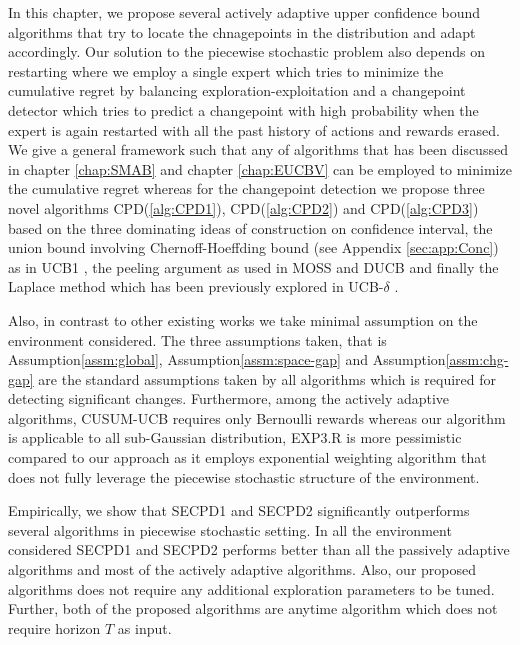 In this chapter, we propose several actively adaptive upper confidence bound algorithms that try to locate the chnagepoints in the distribution and adapt accordingly. Our solution to the piecewise stochastic problem also depends on restarting where we employ a single expert which tries to minimize the cumulative regret by balancing exploration-exploitation and a changepoint detector which tries to predict a changepoint with high probability when the expert is again restarted with all the past history of actions and rewards erased. We give a general framework such that any of algorithms that has been discussed in chapter \ref{chap:SMAB} and chapter \ref{chap:EUCBV} can be employed to minimize the cumulative regret whereas for the changepoint detection we propose three novel algorithms CPD(\ref{alg:CPD1}), CPD(\ref{alg:CPD2}) and CPD(\ref{alg:CPD3}) based on the three dominating ideas of construction on confidence interval, the union bound involving Chernoff-Hoeffding bound (see Appendix \ref{sec:app:Conc}) as in UCB1 \citep{auer2002finite}, the peeling argument as used in MOSS\citep{audibert2009minimax} and DUCB \citep{garivier2011upper} and finally the Laplace method which has been previously explored in UCB-$\delta$ \citep{abbasi2011improved}.

	Also, in contrast to other existing works we take minimal assumption on the environment considered. The three assumptions taken, that is Assumption\ref{assm:global}, Assumption\ref{assm:space-gap} and Assumption\ref{assm:chg-gap} are the standard assumptions taken by all algorithms which is required for detecting significant changes. Furthermore, among the actively adaptive algorithms, CUSUM-UCB requires only Bernoulli rewards whereas our algorithm is applicable to all sub-Gaussian distribution, EXP3.R is more pessimistic compared to our approach as it employs exponential weighting algorithm that does not fully leverage the piecewise stochastic structure of the environment. 
	
	Empirically, we show that SECPD1 and SECPD2 significantly outperforms several algorithms in piecewise stochastic setting. In all the environment considered SECPD1 and SECPD2 performs better than all the passively adaptive algorithms and most of the actively adaptive algorithms. Also, our proposed algorithms does not require any additional exploration parameters to be tuned. Further, both of the proposed algorithms are anytime algorithm which does not require horizon $T$ as input. 